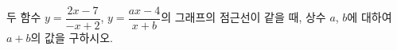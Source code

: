 \hspace*{2mm}\begin{minipage}[t]{\dimexpr\linewidth-2mm\relax}\vspace{0pt}
두 함수 $y=\dfrac{2x-7}{-x+2}$, $y=\dfrac{ax-4}{x+b}$의 그래프의 점근선이 같을 때, 상수 $a$, $b$에 대하여 $a+b$의 값을 구하시오.\end{minipage}
